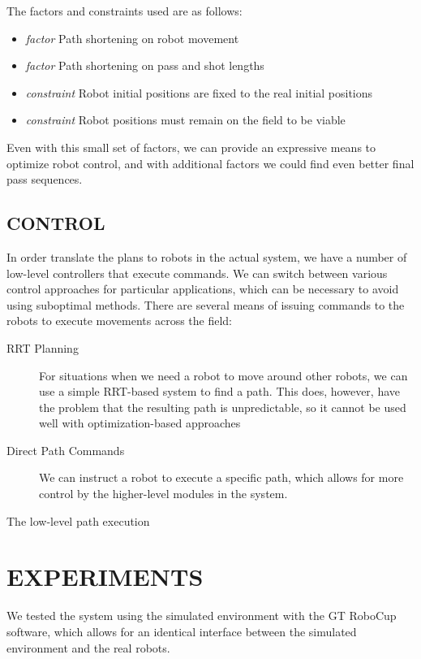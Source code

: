 \documentclass[a4paper, 10pt, conference]{ieeeconf}      %
\begin{document}
The factors and constraints used are as follows:
\begin{itemize}
 \item \textit{factor} Path shortening on robot movement
 \item \textit{factor} Path shortening on pass and shot lengths
 \item \textit{constraint} Robot initial positions are fixed to the real initial positions
 \item \textit{constraint} Robot positions must remain on the field to be viable
\end{itemize}

Even with this small set of factors, we can provide an expressive means to optimize robot control, and with additional factors we could find even better final pass sequences.  

\subsection{CONTROL}
In order translate the plans to robots in the actual system, we have a number of low-level controllers that execute commands. We can switch between various control approaches for particular applications, which can be necessary to avoid using suboptimal methods.  There are several means of issuing commands to the robots to execute movements across the field:
\begin{description}
 \item[RRT Planning] For situations when we need a robot to move around other robots, we can use a simple RRT-based system to find a path.  This does, however, have the problem that the resulting path is unpredictable, so it cannot be used well with optimization-based approaches
 \item[Direct Path Commands] We can instruct a robot to execute a specific path, which allows for more control by the higher-level modules in the system.  
 \end{description}

The low-level path execution 


\section{EXPERIMENTS}
We tested the system using the simulated environment with the GT RoboCup software, which allows for an identical interface between the simulated environment and the real robots.
\end{document}
